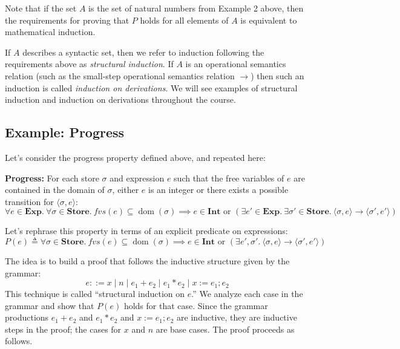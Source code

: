 \documentclass[11pt]{article}
\begin{document}
Note that if the set $A$ is the set of natural numbers from Example 2 above, then the
requirements for proving that $P$ holds for all elements of $A$ is equivalent to mathematical
induction.

If $A$ describes a syntactic set, then we refer to induction following the requirements above
as \emph{structural induction}. If $A$ is an operational semantics relation (such as the
small-step operational semantics relation $\to$) then such an induction is called
\emph{induction on derivations}. We will see examples of structural induction and induction on
derivations throughout the course.

\subsection{Example: Progress}

Let's consider the progress property defined above, and repeated here:

\medskip
\noindent\textbf{Progress:} For each store $\sigma$ and expression $e$ such that the free
variables of $e$ are contained in the domain of $\sigma$, either $e$ is an integer or there
exists a possible transition for $\langle \sigma, e \rangle$:
\[
\forall e \in \mathbf{Exp}.\ \forall \sigma \in \mathbf{Store}.\ fvs(e) \subseteq
\operatorname{dom}(\sigma) \implies e \in \mathbf{Int} \text{ or } (\exists e' \in
\mathbf{Exp}.\ \exists \sigma' \in \mathbf{Store}.\ \langle \sigma, e \rangle \to \langle
\sigma', e' \rangle)
\]

Let's rephrase this property in terms of an explicit predicate on expressions:
\[
P(e) \triangleq \forall \sigma \in \mathbf{Store}.\ fvs(e) \subseteq \operatorname{dom}(\sigma)
\implies e \in \mathbf{Int} \text{ or } (\exists e', \sigma'.\ \langle \sigma, e \rangle \to
\langle \sigma', e' \rangle)
\]

The idea is to build a proof that follows the inductive structure given by the grammar:
\[
e ::= x \mid n \mid e_1 + e_2 \mid e_1 * e_2 \mid x := e_1 ; e_2
\]
This technique is called ``structural induction on $e$.'' We analyze each case in the grammar
and show that $P(e)$ holds for that case. Since the grammar productions $e_1 + e_2$ and $e_1 *
e_2$ and $x := e_1 ; e_2$ are inductive, they are inductive steps in the proof; the cases for
$x$ and $n$ are base cases. The proof proceeds as follows.
\end{document}
